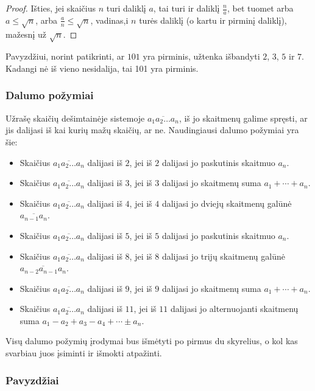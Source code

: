 \begin{proof}
  Išties, jei skaičius $n$ turi daliklį $a$, tai turi ir daliklį
  $\frac{n}{a}$, bet tuomet arba $a\leq \sqrt{n}$, arba $\frac{a}{n} \leq
  \sqrt{n}$, vadinas,i $n$ turės daliklį (o kartu ir pirminį daliklį),
  mažesnį už $\sqrt{n}$. 
\end{proof}

Pavyzdžiui, norint patikrinti, ar $101$ yra pirminis, užtenka išbandyti $2$,
$3$, $5$ ir $7$. Kadangi nė iš vieno nesidalija, tai 101 yra pirminis.

\subsubsection{Dalumo požymiai}

Užrašę skaičių dešimtainėje sistemoje $\overline{a_1a_2\dots a_n}$, iš jo
skaitmenų galime spręsti, ar jis dalijasi iš kai kurių mažų skaičių, ar ne.
Naudingiausi dalumo požymiai yra šie:

\begin{itemize} 
  \item Skaičius $\overline{a_1a_2\dots a_n}$ dalijasi iš $2$, jei iš $2$
    dalijasi jo paskutinis skaitmuo $a_n$.  
  \item Skaičius $\overline{a_1a_2\dots a_n}$ dalijasi iš $3$, jei iš $3$
    dalijasi jo skaitmenų suma $a_1 + \cdots + a_n$.  
  \item Skaičius $\overline{a_1a_2\dots a_n}$ dalijasi iš $4$, jei iš $4$
    dalijasi jo dviejų skaitmenų galūnė $\overline{a_{n-1}a_n}$.  
  \item Skaičius $\overline{a_1a_2\dots a_n}$ dalijasi iš $5$, jei iš $5$
    dalijasi jo paskutinis skaitmuo $a_n$.  
  \item Skaičius $\overline{a_1a_2\dots a_n}$ dalijasi iš $8$, jei iš $8$
    dalijasi jo trijų skaitmenų galūnė $\overline{a_{n-2}a_{n-1}a_n}$.  
  \item Skaičius $\overline{a_1a_2\dots a_n}$ dalijasi iš $9$, jei iš $9$
    dalijasi jo skaitmenų suma $a_1 + \cdots + a_n$.  
  \item Skaičius $\overline{a_1a_2\dots a_n}$ dalijasi iš $11$, jei iš $11$
    dalijasi jo alternuojanti skaitmenų suma $a_1 -a_2+a_3-a_4+ \cdots \pm
    a_n$.  
\end{itemize}

Visų dalumo požymių įrodymai bus išmėtyti po pirmus du skyrelius, o kol kas
svarbiau juos įsiminti ir išmokti atpažinti.

\subsubsection{Pavyzdžiai}

